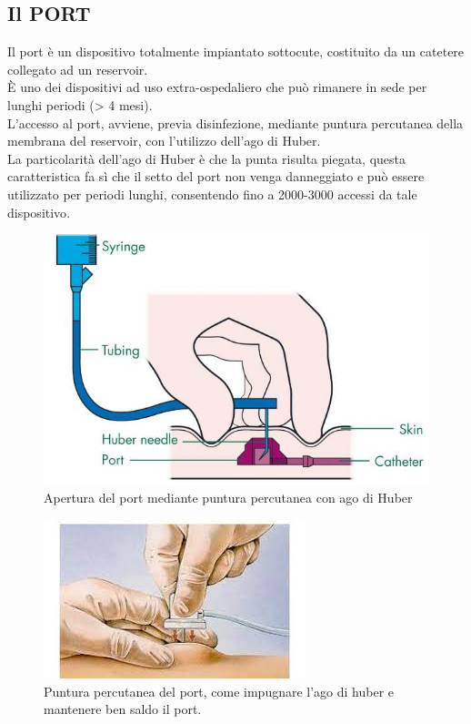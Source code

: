 \subsection{Il PORT}

Il port è un dispositivo totalmente impiantato sottocute, costituito da un catetere collegato ad un reservoir\cite{AIOMCVC}.\\
È uno dei dispositivi ad uso extra-ospedaliero che può rimanere in sede per lunghi periodi (> 4 mesi)\cite{GAVECELTracc2021}.\\
L’accesso al port, avviene, previa disinfezione, mediante puntura percutanea della membrana del reservoir, con 
l’utilizzo dell’ago di Huber\cite{AIOMCVC}.\\
La particolarità dell’ago di Huber è che la punta risulta piegata, questa caratteristica fa sì che il 
setto del port non venga danneggiato e può essere utilizzato per periodi lunghi, %
consentendo fino a 2000-3000 accessi da tale dispositivo\cite{AIOMCVC}.\\

\begin{figure}[H]
    \begin{center}
    \includegraphics[width=0.6\columnwidth]{img/port-a-cath-picc.jpeg}
    \end{center}
    \caption[Apertura del port mediante puntura percutanea con ago di Huber]{Apertura del port mediante puntura percutanea con ago di Huber
    \cite{img43}}

\end{figure}

\begin{figure}[H]
    \begin{center}
    \includegraphics[width=0.5\columnwidth]{img/port2.jpeg}
    \end{center}
    \caption[Puntura percutanea del port, come impugnare l’ago di huber e mantenere ben saldo il port.]{Puntura percutanea del port, come impugnare l’ago di huber e mantenere ben saldo il port.
    \cite{img44}}

\end{figure}

